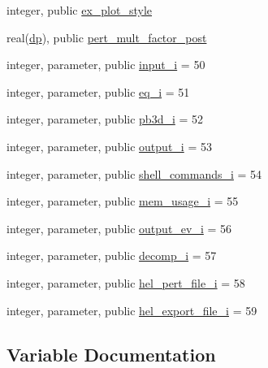 \begin{DoxyCompactItemize}
\item 
integer, public \hyperlink{namespacenum__vars_aac52d1fda60883bea62738fe0ecd7527}{ex\+\_\+plot\+\_\+style}
\item 
real(\hyperlink{namespacenum__vars_a03802aa2bd86439d7a9370836fabf3f2}{dp}), public \hyperlink{namespacenum__vars_aa53d6f71e297c4d8be05907bb7dbffce}{pert\+\_\+mult\+\_\+factor\+\_\+post}
\item 
integer, parameter, public \hyperlink{namespacenum__vars_aba3a56e056e4851ee31a33a448613863}{input\+\_\+i} = 50
\item 
integer, parameter, public \hyperlink{namespacenum__vars_a7b97a4fd25cbf874cbfe63417ba307ff}{eq\+\_\+i} = 51
\item 
integer, parameter, public \hyperlink{namespacenum__vars_aa59942bdbb47a383030d0bcc21e1a3c0}{pb3d\+\_\+i} = 52
\item 
integer, parameter, public \hyperlink{namespacenum__vars_aec5ffb30114a8af11226208844d12998}{output\+\_\+i} = 53
\item 
integer, parameter, public \hyperlink{namespacenum__vars_a2e139da75c6bcec4376b38d3ea1c5aa7}{shell\+\_\+commands\+\_\+i} = 54
\item 
integer, parameter, public \hyperlink{namespacenum__vars_a606c68d407ec135c105f0501c224ea1b}{mem\+\_\+usage\+\_\+i} = 55
\item 
integer, parameter, public \hyperlink{namespacenum__vars_a98774008e1bfbed335a89f813c7dcbde}{output\+\_\+ev\+\_\+i} = 56
\item 
integer, parameter, public \hyperlink{namespacenum__vars_a886394fc855acaa9a5e4ab5b3ce8c9d9}{decomp\+\_\+i} = 57
\item 
integer, parameter, public \hyperlink{namespacenum__vars_a50cdcd1fe293ae7ab0e1c36ae589b969}{hel\+\_\+pert\+\_\+file\+\_\+i} = 58
\item 
integer, parameter, public \hyperlink{namespacenum__vars_aad2b139a01fd89c8b1dafb7c9c69dd30}{hel\+\_\+export\+\_\+file\+\_\+i} = 59
\end{DoxyCompactItemize}


\subsection{Variable Documentation}
\mbox{\label{namespacenum__vars_aabda06d22d0bad62383df3a0d977a82c}} 
